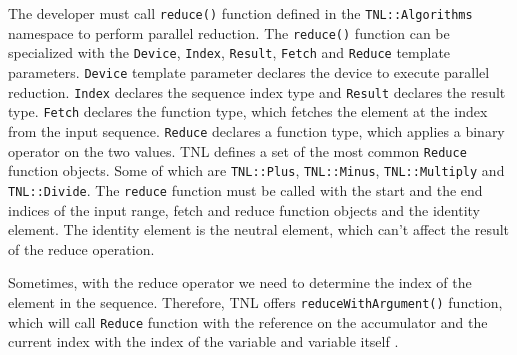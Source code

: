 The developer must call \texttt{reduce()} function defined in the \texttt{TNL::Algorithms} namespace to perform parallel reduction.
The \texttt{reduce()} function can be specialized with the \texttt{Device}, \texttt{Index}, \texttt{Result}, \texttt{Fetch} and \texttt{Reduce} template parameters.
\texttt{Device} template parameter declares the device to execute parallel reduction.
\texttt{Index} declares the sequence index type and \texttt{Result} declares the result type.
\texttt{Fetch} declares the function type, which fetches the element at the index from the input sequence.
\texttt{Reduce} declares a function type, which applies a binary operator on the two values.
TNL defines a set of the most common \texttt{Reduce} function objects.
Some of which are \texttt{TNL::Plus}, \texttt{TNL::Minus}, \texttt{TNL::Multiply} and \texttt{TNL::Divide}.
The \texttt{reduce} function must be called with the start and the end indices of the input range, fetch and reduce function objects and the identity element.
The identity element is the neutral element, which can't affect the result of the reduce operation.

Sometimes, with the reduce operator we need to determine the index of the element in the sequence.
Therefore, TNL offers \texttt{reduceWithArgument()} function, which will call \texttt{Reduce} function with the reference on the accumulator and the current index with the index of the variable and variable itself \cite{TNLParallelReduce}.
